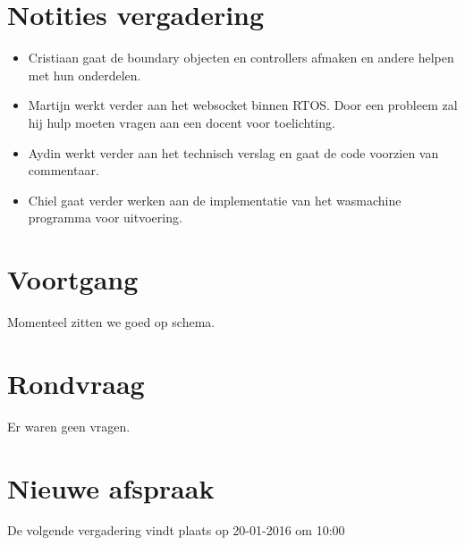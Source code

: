 \documentclass[dutch]{hu}
\begin{document}
\section{Notities vergadering}
\begin{itemize}

\item Cristiaan gaat de boundary objecten en controllers afmaken en andere helpen met hun onderdelen.
\item Martijn werkt verder aan het websocket binnen RTOS. Door een probleem zal hij hulp moeten vragen aan een docent voor toelichting.
\item Aydin werkt verder aan het technisch verslag en gaat de code voorzien van commentaar.
\item Chiel gaat verder werken aan de implementatie van het wasmachine programma voor uitvoering.

\end{itemize}

\section{Voortgang}
Momenteel zitten we goed op schema.

\section{Rondvraag}
Er waren geen vragen.

\section{Nieuwe afspraak}
De volgende vergadering vindt plaats op 20-01-2016 om 10:00
\end{document}
